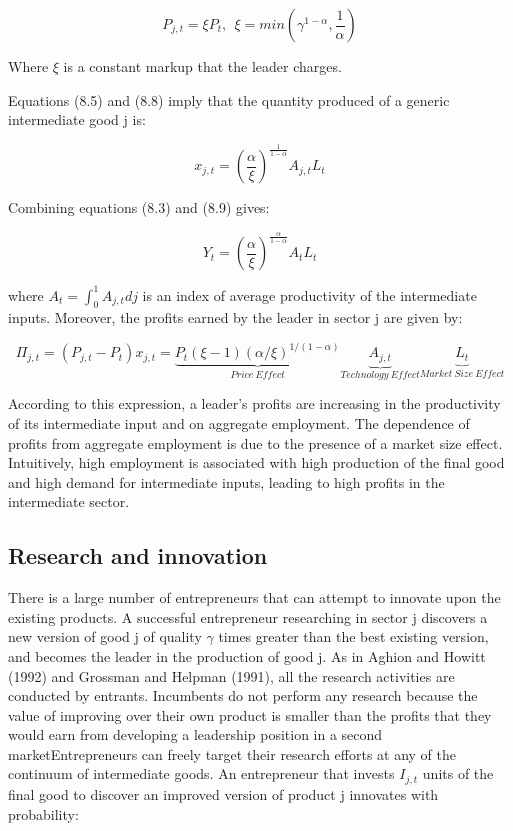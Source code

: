 \documentclass[10pt,math=newtx,citestyle=gb7714-2015,bibstyle=gb7714-2015]{elegantbook}
\begin{document}
{{{	\begin{equation}
		P_{j,t} = \xi P_t, ~~ \xi = min( \gamma^{1-\alpha}, \frac{1}{\alpha} )
	\end{equation}
	
	Where $\xi$ is a constant markup that the leader charges.
	
	Equations (8.5) and (8.8) imply that the quantity produced of a generic intermediate good j is:
	
	\begin{equation}
		x_{j,t} = \left(\frac{\alpha}{\xi}\right)^{\frac{1}{1-\alpha}}A_{j,t}L_t
	\end{equation}
	
	Combining equations (8.3) and (8.9) gives:
	
	\begin{equation}
		Y_t = \left(\frac{\alpha}{\xi}\right)^{\frac{\alpha}{1-\alpha}}A_{t}L_t
	\end{equation}
	
	where $A_t = \int_0^1 A_{j,t} dj$ is an index of average productivity of the intermediate inputs. Moreover, the profits earned by the leader in sector j are given by:
	
	$$\Pi_{j,t} = (P_{j,t} - P_t)x_{j,t} =\underbrace{P_t (\xi-1)(\alpha / \xi)^{1 /(1-\alpha)}}_{Price~Effect} \underbrace{A_{j,t}}_{Technology~Effect} \underbrace{L_t}_{Market~Size~Effect}$$
	
	According to this expression, a leader’s profits are increasing in the productivity of its intermediate input and on aggregate employment. The dependence of profits from aggregate employment is due to the presence of a market size effect. Intuitively, high employment is associated with high production of the final good and high demand for intermediate inputs, leading to high profits in the intermediate sector.
	
	\subsection{Research and innovation}
	
	There is a large number of entrepreneurs that can attempt to innovate upon the existing products. A successful entrepreneur researching in sector j discovers a new version of good j of quality $\gamma$ times greater than the best existing version, and becomes the leader in the production of good j. As in Aghion and Howitt (1992) and Grossman and Helpman (1991), all the research activities are conducted by entrants. Incumbents do not perform any research because the value of improving over their own product is smaller than the profits that they would earn from developing a leadership position in a second marketEntrepreneurs can freely target their research efforts at any of the continuum of intermediate goods. An entrepreneur that invests $I_{j,t}$ units of the final good to discover an improved version of product j innovates with probability:
	
}}}
\end{document}
